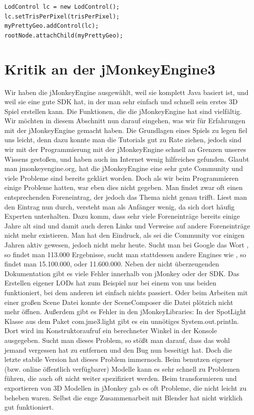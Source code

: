 \begin{lstlisting}
LodControl lc = new LodControl();
lc.setTrisPerPixel(trisPerPixel);
myPrettyGeo.addControl(lc);
rootNode.attachChild(myPrettyGeo);
\end{lstlisting}


\section{Kritik an der jMonkeyEngine3}
Wir haben die jMonkeyEngine ausgewählt, weil sie komplett Java basiert ist, und weil sie eine gute SDK hat, in der man sehr einfach und schnell sein erstes 3D Spiel erstellen kann. Die Funktionen, die die jMonkeyEngine hat sind vielfältig. Wir möchten in diesem Abschnitt nun darauf eingehen, was wir für Erfahrungen mit der jMonkeyEngine gemacht haben. Die Grundlagen eines Spiels zu legen fiel uns leicht, denn dazu konnte man die Tutorials gut zu Rate ziehen, jedoch sind wir mit der Programmierung mit der jMonkeyEngine schnell an Grenzen unseres Wissens gestoßen, und haben auch im Internet wenig hilfreiches gefunden. Glaubt man jmonkeyengine.org, hat die jMonkeyEngine eine sehr gute Community und viele Probleme sind bereits geklärt worden. Doch als wir beim Programmieren einige Probleme hatten, war eben dies nicht gegeben. Man findet zwar oft einen entsprechenden Foreneintrag, der jedoch das Thema nicht genau trifft. Liest man den Eintrag nun durch, versteht man als Anfänger wenig, da sich dort häufig Experten unterhalten. Dazu komm, dass sehr viele Foreneinträge bereits einige Jahre alt sind und damit auch deren Links und Verweise auf andere Foreneinträge nicht mehr existieren. Man hat den Eindruck, als sei die Community vor einigen Jahren aktiv gewesen, jedoch nicht mehr heute. Sucht man bei Google das Wort , so findet man 113.000 Ergebnisse, sucht man stattdessen andere Engines wie , so findet man 15.100.000, oder  11.600.000. Neben der nicht überzeugenden Dokumentation gibt es viele Fehler innerhalb von jMonkey oder der SDK. Das Erstellen eigener LODs hat zum Beispiel nur bei einem von uns beiden funktioniert, bei dem anderen ist einfach nichts passiert. Oder beim Arbeiten mit einer großen Scene Datei konnte der SceneComposer die Datei plötzich nicht mehr öffnen. Außerdem gibt es Fehler in den jMonkeyLibraries: In der SpotLight Klasse aus dem Paket com.jme3.light gibt es ein unnötiges System.out.println. Dort wird im Konstruktoraufruf ein berechneter Winkel in der Konsole ausgegeben. Sucht man dieses Problem, so stößt man darauf, dass das wohl jemand vergessen hat zu entfernen und den Bug nun beseitigt hat. Doch die letzte stabile Version hat dieses Problem immernoch. Beim benutzen eigener (bzw. online öffentlich verfügbarer) Modelle kann es sehr schnell zu Problemen führen, die auch oft nicht weiter spezifiziert werden. Beim transformieren und exportieren von 3D Modellen in jMonkey gab es oft Probleme, die nicht leicht zu beheben waren. Selbst die enge Zusammenarbeit mit Blender hat nicht wirklich gut funktioniert.
